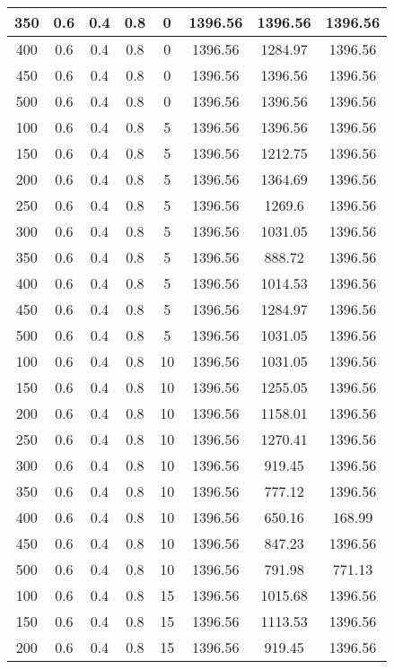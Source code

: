 \documentclass[a4paper, 12pt]{extreport}
\begin{document}
\begin{itemize}
\begin{longtable}{|c|c|c|c|c|c|c|c|}
			350 & 0.6 & 0.4 & 0.8 & 0 & 1396.56 & 1396.56 & 1396.56 \\\hline
			400 & 0.6 & 0.4 & 0.8 & 0 & 1396.56 & 1284.97 & 1396.56 \\\hline
			450 & 0.6 & 0.4 & 0.8 & 0 & 1396.56 & 1396.56 & 1396.56 \\\hline
			500 & 0.6 & 0.4 & 0.8 & 0 & 1396.56 & 1396.56 & 1396.56 \\\hline
			100 & 0.6 & 0.4 & 0.8 & 5 & 1396.56 & 1396.56 & 1396.56 \\\hline
			150 & 0.6 & 0.4 & 0.8 & 5 & 1396.56 & 1212.75 & 1396.56 \\\hline
			200 & 0.6 & 0.4 & 0.8 & 5 & 1396.56 & 1364.69 & 1396.56 \\\hline
			250 & 0.6 & 0.4 & 0.8 & 5 & 1396.56 & 1269.6 & 1396.56 \\\hline
			300 & 0.6 & 0.4 & 0.8 & 5 & 1396.56 & 1031.05 & 1396.56 \\\hline
			350 & 0.6 & 0.4 & 0.8 & 5 & 1396.56 & 888.72 & 1396.56 \\\hline
			400 & 0.6 & 0.4 & 0.8 & 5 & 1396.56 & 1014.53 & 1396.56 \\\hline
			450 & 0.6 & 0.4 & 0.8 & 5 & 1396.56 & 1284.97 & 1396.56 \\\hline
			500 & 0.6 & 0.4 & 0.8 & 5 & 1396.56 & 1031.05 & 1396.56 \\\hline
			100 & 0.6 & 0.4 & 0.8 & 10 & 1396.56 & 1031.05 & 1396.56 \\\hline
			150 & 0.6 & 0.4 & 0.8 & 10 & 1396.56 & 1255.05 & 1396.56 \\\hline
			200 & 0.6 & 0.4 & 0.8 & 10 & 1396.56 & 1158.01 & 1396.56 \\\hline
			250 & 0.6 & 0.4 & 0.8 & 10 & 1396.56 & 1270.41 & 1396.56 \\\hline
			300 & 0.6 & 0.4 & 0.8 & 10 & 1396.56 & 919.45 & 1396.56 \\\hline
			350 & 0.6 & 0.4 & 0.8 & 10 & 1396.56 & 777.12 & 1396.56 \\\hline
			400 & 0.6 & 0.4 & 0.8 & 10 & 1396.56 & 650.16 & 168.99 \\\hline
			450 & 0.6 & 0.4 & 0.8 & 10 & 1396.56 & 847.23 & 1396.56 \\\hline
			500 & 0.6 & 0.4 & 0.8 & 10 & 1396.56 & 791.98 & 771.13 \\\hline
			100 & 0.6 & 0.4 & 0.8 & 15 & 1396.56 & 1015.68 & 1396.56 \\\hline
			150 & 0.6 & 0.4 & 0.8 & 15 & 1396.56 & 1113.53 & 1396.56 \\\hline
			200 & 0.6 & 0.4 & 0.8 & 15 & 1396.56 & 919.45 & 1396.56 \\\hline

\end{longtable}
\end{itemize}
\end{document}
